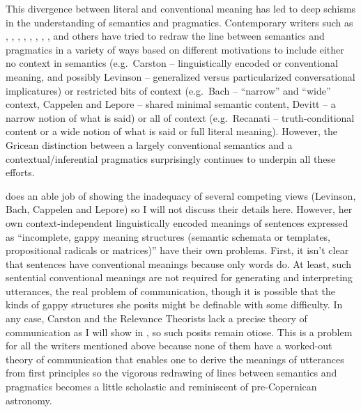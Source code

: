 
This divergence between literal and conventional meaning has led to deep schisms in the understanding of semantics and pragmatics. Contemporary writers such as \citet{bach:tr, bach:yds}, \citet{levinson:pm}, \citet{recanati:lm}, \citet{bianchi:spd}, \citet{cl:is}, \citet{szabo:svp}, \citet{carston:lcspd}, \citet{devitt:wmps}, and others have tried to redraw the line between semantics and pragmatics in a variety of ways based on different motivations to include either no context in semantics (e.g.\ Carston -- linguistically encoded or conventional meaning, and possibly Levinson -- generalized versus particularized conversational implicatures) or restricted bits of context (e.g.\ Bach -- ``narrow'' and ``wide'' context, Cappelen and Lepore -- shared minimal semantic content, Devitt -- a narrow notion of what is said) or all of context (e.g.\ Recanati -- truth-conditional content or a wide notion of what is said or full literal meaning). However, the Gricean distinction between a largely conventional semantics and a contextual/inferential pragmatics surprisingly continues to underpin all these efforts.

\citet{carston:tcci, carston:lcspd} does an able job of showing the inadequacy of several competing views (Levinson, Bach, Cappelen and Lepore) so I will not discuss their details here. However, her own context-independent linguistically encoded meanings of sentences expressed as ``incomplete, gappy meaning structures (semantic schemata or templates, propositional radicals or matrices)'' have their own problems. First, it isn't clear that sentences have conventional meanings because only words do. At least, such sentential conventional meanings are not required for generating and interpreting utterances, the real problem of communication, though it is possible that the kinds of gappy structures she posits might be definable with some difficulty. In any case, Carston and the Relevance Theorists lack a precise theory of communication as I will show in , so such posits remain otiose. This is a problem for all the writers mentioned above because none of them have a worked-out theory of communication that enables one to derive the meanings of utterances from first principles so the vigorous redrawing of lines between semantics and pragmatics becomes a little scholastic and reminiscent of pre-Copernican astronomy. 

